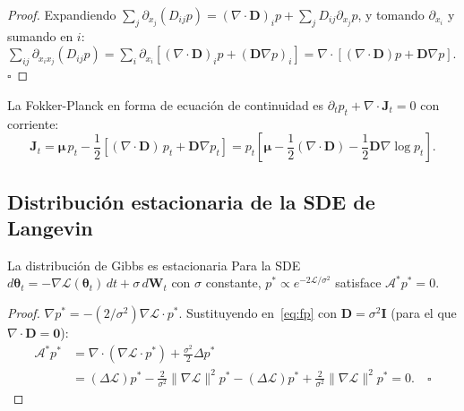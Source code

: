 \begin{proof}
Expandiendo $\sum_j\partial_{x_j}(D_{ij}p) = (\nabla\cdot\bm{D})_i p +
\sum_j D_{ij}\partial_{x_j}p$, y tomando $\partial_{x_i}$ y sumando en $i$:
$\sum_{ij}\partial_{x_ix_j}(D_{ij}p) = \sum_i\partial_{x_i}[(\nabla\cdot\bm{D})_i p
+ (\bm{D}\nabla p)_i] = \nabla\cdot[(\nabla\cdot\bm{D})p + \bm{D}\nabla p]$.
$\square$
\end{proof}

La Fokker-Planck en forma de ecuación de continuidad es $\partial_t p_t +
\nabla\cdot\bm{J}_t = 0$ con corriente:
\begin{equation}
  \bm{J}_t = \bm{\mu}\,p_t - \frac{1}{2}[(\nabla\cdot\bm{D})\,p_t + \bm{D}\nabla p_t]
  = p_t\!\left[\bm{\mu} - \frac{1}{2}(\nabla\cdot\bm{D}) - \frac{1}{2}\bm{D}\nabla\log p_t\right].
  \label{eq:corriente}
\end{equation}

\subsection{Distribución estacionaria de la SDE de Langevin}
\label{subsec:gibbs_verificacion}

\begin{proposicion}{La distribución de Gibbs es estacionaria}
\label{prop:gibbs_estacionaria}
Para la SDE $d\bm{\theta}_t = -\nabla\mathcal{L}(\bm{\theta}_t)\,dt +
\sigma\,d\bm{W}_t$ con $\sigma$ constante, $p^* \propto e^{-2\mathcal{L}/\sigma^2}$
satisface $\mathcal{A}^*p^* = 0$.
\end{proposicion}

\begin{proof}
$\nabla p^* = -(2/\sigma^2)\nabla\mathcal{L}\cdot p^*$. Sustituyendo en~\eqref{eq:fp}
con $\bm{D} = \sigma^2\bm{I}$ (para el que $\nabla\cdot\bm{D} = \bm{0}$):
\begin{align*}
  \mathcal{A}^*p^*
  &= \nabla\cdot(\nabla\mathcal{L}\cdot p^*) + \tfrac{\sigma^2}{2}\Delta p^* \\
  &= (\Delta\mathcal{L})p^* - \tfrac{2}{\sigma^2}\|\nabla\mathcal{L}\|^2 p^*
    - (\Delta\mathcal{L})p^* + \tfrac{2}{\sigma^2}\|\nabla\mathcal{L}\|^2 p^* = 0.
    \quad\square
\end{align*}
\end{proof}

